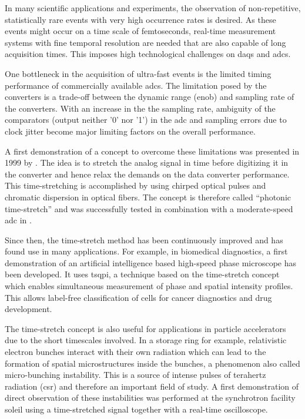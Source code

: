 In many scientific applications and experiments, the observation of non-repetitive, statistically rare events with very high occurrence rates is desired.
As these events might occur on a time scale of femtoseconds, real-time measurement systems with fine temporal resolution are needed that are also capable of long acquisition times.
This imposes high technological challenges on \glspl{daq} and \glspl{adc}.

One bottleneck in the acquisition of ultra-fast events is the limited timing performance of commercially available \glspl{adc}. 
The limitation posed by the converters is a trade-off between the dynamic range (\gls{enob}) and sampling rate of the converters.
With an increase in the the sampling rate, ambiguity of the comparators (output neither '0' nor '1') in the \gls{adc} and sampling errors due to clock jitter become major limiting factors on the overall performance. \cite{Mahjoubfar2017}

A first demonstration of a concept to overcome these limitations was presented in 1999 by \cite{ts_adc}. 
The idea is to stretch the analog signal in time before digitizing it in the converter and hence relax the demands on the data converter performance. 
This time-stretching is accomplished by using chirped optical pulses and chromatic dispersion in optical fibers.
The concept is therefore called ``photonic time-stretch'' and was successfully tested in combination with a moderate-speed \gls{adc} in \cite{ts_adc}.

Since then, the time-stretch method has been continuously improved and has found use in many applications.
For example, in biomedical diagnostics, a first demonstration of an artificial intelligence based high-speed phase microscope has been developed. 
It uses \gls{tsqpi}, a technique based on the time-stretch concept which enables simultaneous measurement of phase and spatial intensity profiles.
This allows label-free classification of cells for cancer diagnostics and drug development. \cite{Mahjoubfar2017} 

The time-stretch concept is also useful for applications in particle accelerators due to the short timescales involved.
In a storage ring for example, relativistic electron bunches interact with their own radiation which can lead to the formation of spatial microstructures inside the bunches, a phenomenon also called micro-bunching instability.
This is a source of intense pulses of terahertz radiation (\gls{csr}) and therefore an important field of study. 
A first demonstration of direct observation of these instabilities was performed at the synchrotron facility \gls{soleil} using a time-stretched signal together with a real-time oscilloscope. \cite{Roussel2015}


